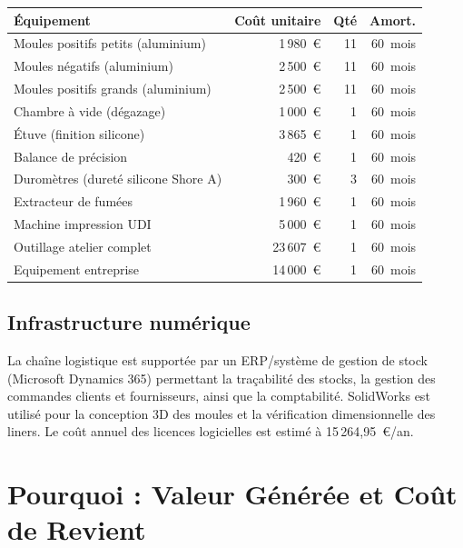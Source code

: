 \vspace{0.5em}
\begin{center}
\begin{tabular}{lrrr}
  \toprule
  \textbf{Équipement} & \textbf{Coût unitaire} & \textbf{Qté} & \textbf{Amort.} \\
  \midrule
  Moules positifs petits (aluminium)   & 1\,980~\euro{}  & 11 & 60~mois \\
  Moules négatifs (aluminium)          & 2\,500~\euro{}  & 11 & 60~mois \\
  Moules positifs grands (aluminium)   & 2\,500~\euro{}  & 11 & 60~mois \\
  Chambre à vide (dégazage)            & 1\,000~\euro{}  &  1 & 60~mois \\
  Étuve (finition silicone)            & 3\,865~\euro{}  &  1 & 60~mois \\
  Balance de précision                 &   420~\euro{}   &  1 & 60~mois \\
  Duromètres (dureté silicone Shore A) &   300~\euro{}   &  3 & 60~mois \\
  Extracteur de fumées                 & 1\,960~\euro{}  &  1 & 60~mois \\
  Machine impression UDI               & 5\,000~\euro{}  &  1 & 60~mois \\
  Outillage atelier complet            & 23\,607~\euro{} &  1 & 60~mois \\
  Equipement entreprise                & 14\,000~\euro{}  &  1 & 60~mois \\
   \midrule
  \bottomrule
\end{tabular}
\end{center}
\vspace{0.5em}

\subsection{Infrastructure numérique}

La chaîne logistique est supportée par un ERP/système de gestion de stock
(Microsoft Dynamics 365) permettant la traçabilité des stocks, la gestion des commandes
clients et fournisseurs, ainsi que la comptabilité. SolidWorks est utilisé pour la conception 3D des
moules et la vérification dimensionnelle des liners. Le coût annuel des licences logicielles est estimé
à 15\,264,95~\euro{}/an.

\section{Pourquoi : Valeur Générée et Coût de Revient}

